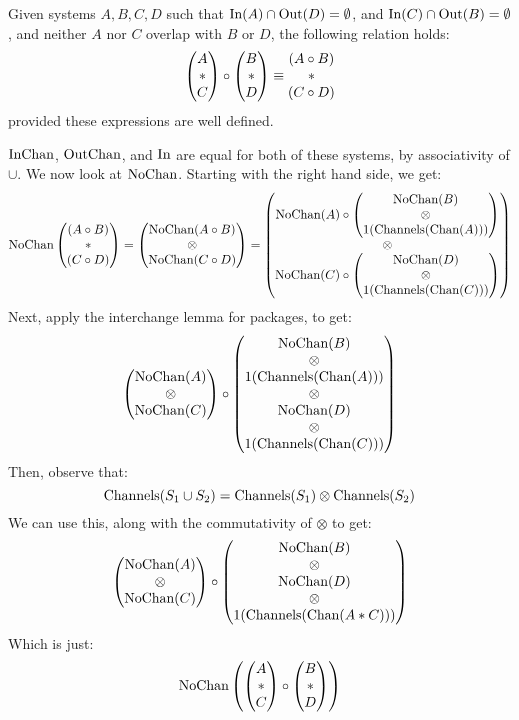\begin{lemma}
\label{thm:interchange_system}
Given systems $A, B, C, D$ such that $\text{In}(A) \cap \text{Out}(D) = \emptyset$,
and $\text{In}(C) \cap \text{Out}(B) = \emptyset$,
and neither $A$ nor $C$ overlap with $B$ or $D$,
the following relation holds:
$$
\begin{pmatrix} 
A\cr
*\cr
C\cr
\end{pmatrix} 
\circ
\begin{pmatrix} 
B\cr
*\cr
D\cr
\end{pmatrix} 
\equiv
\begin{matrix} 
  (A \circ B)\cr
*\cr
  (C \circ D)\cr
\end{matrix} 
$$
provided these expressions are well defined.

 $\text{InChan}$, $\text{OutChan}$, and $\text{In}$ are equal for
both of these systems, by associativity of $\cup$.
We now look at $\text{NoChan}$.
Starting with the right hand side, we get:
$$
\text{NoChan}
\begin{pmatrix} 
  (A \circ B)\cr
*\cr
  (C \circ D)\cr
\end{pmatrix} 
= 
\begin{pmatrix}
  \text{NoChan}(A \circ B)\cr
  \otimes\cr
  \text{NoChan}(C \circ D)
\end{pmatrix}
=
\begin{pmatrix}
    \text{NoChan}(A) \circ
    \begin{pmatrix}
      \text{NoChan}(B)\cr
      \otimes\cr
      1(\text{Channels}(\text{Chan}(A)))
    \end{pmatrix}
  \cr
  \otimes\cr
    \text{NoChan}(C) \circ
    \begin{pmatrix}
      \text{NoChan}(D)\cr
      \otimes\cr
      1(\text{Channels}(\text{Chan}(C)))
    \end{pmatrix}
\end{pmatrix}
$$
Next, apply the interchange lemma for packages, to get:
$$
\begin{pmatrix}
  \text{NoChan}(A)\cr
  \otimes\cr
  \text{NoChan}(C)
\end{pmatrix}
\circ
\begin{pmatrix}
  \text{NoChan}(B)\cr
  \otimes\cr
  1(\text{Channels}(\text{Chan}(A)))\cr
  \otimes\cr
  \text{NoChan}(D)\cr
  \otimes\cr
  1(\text{Channels}(\text{Chan}(C)))\cr
\end{pmatrix}
$$
Then, observe that:
$$
\text{Channels}(S_1 \cup S_2) = \text{Channels}(S_1) \otimes \text{Channels}(S_2)
$$
We can use this, along with the commutativity of $\otimes$ to get:
$$
\begin{pmatrix}
  \text{NoChan}(A)\cr
  \otimes\cr
  \text{NoChan}(C)
\end{pmatrix}
\circ
\begin{pmatrix}
  \text{NoChan}(B)\cr
  \otimes\cr
  \text{NoChan}(D)\cr
  \otimes\cr
  1(\text{Channels}(\text{Chan}(A * C)))\cr
\end{pmatrix}
$$
Which is just:
$$
\text{NoChan}
\left(
\begin{pmatrix} 
A\cr
*\cr
C\cr
\end{pmatrix} 
\circ
\begin{pmatrix} 
B\cr
*\cr
D\cr
\end{pmatrix} 
\right)
$$


\end{lemma}
